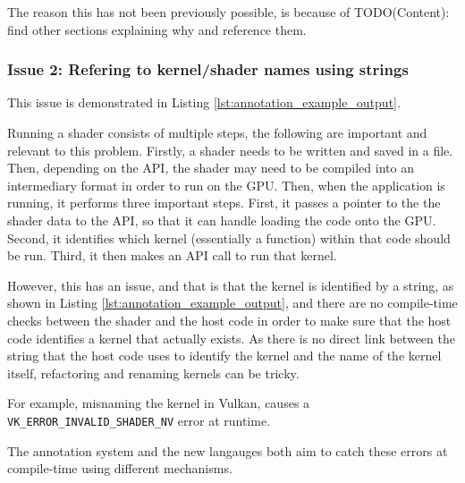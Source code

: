\documentclass[a4paper,12pt,twoside,openright]{report}
\begin{document}
The reason this has not been previously possible, is because of TODO(Content): find
other sections explaining why and reference them.

\subsubsection{Issue 2: Refering to kernel/shader names using strings}

This issue is demonstrated in Listing \ref{lst:annotation_example_output}.

Running a shader consists of multiple steps, the following are important and
relevant to this problem. Firstly, a shader needs to be written and saved in a
file. Then, depending on the API, the shader may need to be compiled into an
intermediary format in order to run on the GPU. Then, when the application is
running, it performs three important steps. First, it passes a pointer to the
the shader data to the API, so that it can handle loading the code onto the
GPU. Second, it identifies which kernel (essentially a function) within that
code should be run. Third, it then makes an API call to run that kernel.

However, this has an issue, and that is that the kernel is identified by a
string, as shown in Listing \ref{lst:annotation_example_output}, and there are
no compile-time checks between the shader and the host code in order to make
sure that the host code identifies a kernel that actually exists. As there is
no direct link between the string that the host code uses to identify the
kernel and the name of the kernel itself, refactoring and renaming kernels can
be tricky.

For example, misnaming the kernel in Vulkan, causes a
\texttt{VK\_ERROR\_INVALID\_SHADER\_NV} error at runtime.



The annotation system and the new langauges both aim to catch these errors at
compile-time using different mechanisms.


\end{document}
